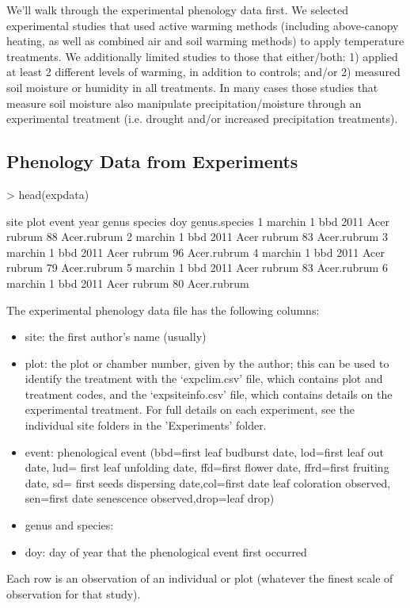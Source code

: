 \documentclass{article}
\begin{document}
We'll walk through the experimental phenology data first. We selected experimental studies that used active warming methods (including above-canopy heating, as well as combined air and soil warming methods) to apply temperature treatments. We additionally limited studies to those that either/both: 1) applied at least 2 different levels of warming, in addition to controls; and/or 2) measured soil moisture or humidity in all treatments. In many cases those studies that measure soil moisture also manipulate precipitation/moisture through an experimental treatment (i.e. drought and/or increased precipitation treatments).
\subsection{Phenology Data from Experiments}

\begin{Schunk}
\begin{Sinput}
> head(expdata)
\end{Sinput}
\begin{Soutput}
     site plot event year genus species doy genus.species
1 marchin    1   bbd 2011  Acer  rubrum  88   Acer.rubrum
2 marchin    1   bbd 2011  Acer  rubrum  83   Acer.rubrum
3 marchin    1   bbd 2011  Acer  rubrum  96   Acer.rubrum
4 marchin    1   bbd 2011  Acer  rubrum  79   Acer.rubrum
5 marchin    1   bbd 2011  Acer  rubrum  83   Acer.rubrum
6 marchin    1   bbd 2011  Acer  rubrum  80   Acer.rubrum
\end{Soutput}
\end{Schunk}
The experimental phenology data file has the following columns:
\begin{itemize}
  \item site: the first author's name (usually)
\item plot: the plot or chamber number, given by the author; this can be used to identify the treatment with the `expclim.csv' file, which contains plot and treatment codes, and the `expsiteinfo.csv' file, which contains details on the experimental treatment. For full details on each experiment, see the individual site folders in the 'Experiments' folder.
\item event: phenological event (bbd=first leaf budburst date, lod=first leaf out date, lud= first leaf unfolding date, ffd=first flower date, ffrd=first fruiting date, sd= first seeds dispersing date,col=first date leaf coloration observed, sen=first date senescence observed,drop=leaf drop)
\item genus and species: 
\item doy: day of year that the phenological event first occurred

\end{itemize}
Each row is an observation of an individual or plot (whatever the finest scale of observation for that study).
\end{document}
